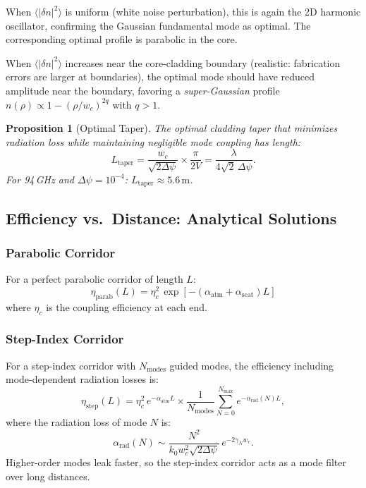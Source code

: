 \documentclass[journal,twocolumn]{IEEEtran}
\newtheorem{proposition}{Proposition}
\begin{document}
When $\langle|\delta n|^2\rangle$ is uniform (white noise perturbation),
this is again the 2D harmonic oscillator, confirming the Gaussian
fundamental mode as optimal. The corresponding optimal profile is
parabolic in the core.

When $\langle|\delta n|^2\rangle$ increases near the core-cladding
boundary (realistic: fabrication errors are larger at boundaries),
the optimal mode should have reduced amplitude near the boundary,
favoring a \emph{super-Gaussian} profile $n(\rho) \propto
1 - (\rho/w_c)^{2q}$ with $q > 1$.

\begin{proposition}[Optimal Taper]
The optimal cladding taper that minimizes radiation loss while
maintaining negligible mode coupling has length:
\begin{equation}
L_\text{taper} = \frac{w_c}{\sqrt{2\Delta\psi}} \times \frac{\pi}{2V}
= \frac{\lambda}{4\sqrt{2}\,\Delta\psi}.
\end{equation}
For 94\,GHz and $\Delta\psi = 10^{-4}$:
$L_\text{taper} \approx 5.6\,\text{m}$.
\end{proposition}

\subsection{Efficiency vs.\ Distance: Analytical Solutions}

\subsubsection{Parabolic Corridor}

For a perfect parabolic corridor of length $L$:
\begin{equation}
\boxed{
\eta_\text{parab}(L) = \eta_c^2\,\exp\!\left[-(\alpha_\text{atm}
+ \alpha_\text{scat})L\right]
}
\label{eq:eff_parab}
\end{equation}
where $\eta_c$ is the coupling efficiency at each end.

\subsubsection{Step-Index Corridor}

For a step-index corridor with $N_\text{modes}$ guided modes, the
efficiency including mode-dependent radiation losses is:
\begin{equation}
\eta_\text{step}(L) = \eta_c^2\,e^{-\alpha_\text{atm}L}
\times \frac{1}{N_\text{modes}}
\sum_{N=0}^{N_\text{max}} e^{-\alpha_\text{rad}(N)L},
\label{eq:eff_step}
\end{equation}
where the radiation loss of mode $N$ is:
\begin{equation}
\alpha_\text{rad}(N) \sim \frac{N^2}{k_0 w_c^2\sqrt{2\Delta\psi}}\,
e^{-2\gamma_N w_c}.
\end{equation}
Higher-order modes leak faster, so the step-index corridor
acts as a mode filter over long distances.
\end{document}
